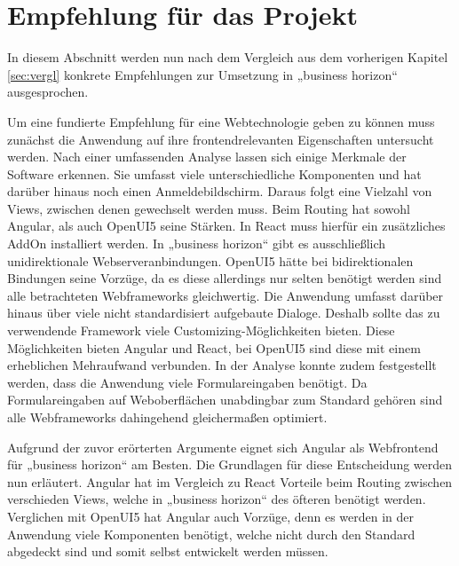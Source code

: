 \section{Empfehlung für das Projekt}\label{sec:empf}

In diesem Abschnitt werden nun nach dem Vergleich aus dem vorherigen Kapitel \ref{sec:vergl} konkrete Empfehlungen zur Umsetzung in „business horizon“ ausgesprochen.

Um eine fundierte Empfehlung für eine Webtechnologie geben zu können muss zunächst die Anwendung auf ihre frontendrelevanten Eigenschaften untersucht werden. Nach einer umfassenden Analyse lassen sich einige Merkmale der Software erkennen. 
Sie umfasst viele unterschiedliche Komponenten und hat darüber hinaus noch einen Anmeldebildschirm. Daraus folgt eine Vielzahl von Views, zwischen denen gewechselt werden muss. Beim Routing hat sowohl Angular, als auch OpenUI5 seine Stärken. In React muss hierfür ein zusätzliches AddOn installiert werden.
In „business horizon“ gibt es ausschließlich unidirektionale Webserveranbindungen. OpenUI5 hätte bei bidirektionalen Bindungen seine Vorzüge, da es diese allerdings nur selten benötigt werden sind alle betrachteten Webframeworks gleichwertig.
Die Anwendung umfasst darüber hinaus über viele nicht standardisiert aufgebaute Dialoge. Deshalb sollte das zu verwendende Framework viele Customizing-Möglichkeiten bieten. Diese Möglichkeiten bieten Angular und React, bei OpenUI5 sind diese mit einem erheblichen Mehraufwand verbunden.
In der Analyse konnte zudem festgestellt werden, dass die Anwendung viele Formulareingaben benötigt. Da Formulareingaben auf Weboberflächen unabdingbar zum Standard gehören sind alle Webframeworks dahingehend gleichermaßen optimiert.

Aufgrund der zuvor erörterten Argumente eignet sich Angular als Webfrontend für „business horizon“ am Besten. Die Grundlagen für diese Entscheidung werden nun erläutert. Angular hat im Vergleich zu React Vorteile beim Routing zwischen verschieden Views, welche in „business horizon“ des öfteren benötigt werden. Verglichen mit OpenUI5 hat Angular auch Vorzüge, denn es werden in der Anwendung viele Komponenten benötigt, welche nicht durch den Standard abgedeckt sind und somit selbst entwickelt werden müssen.


